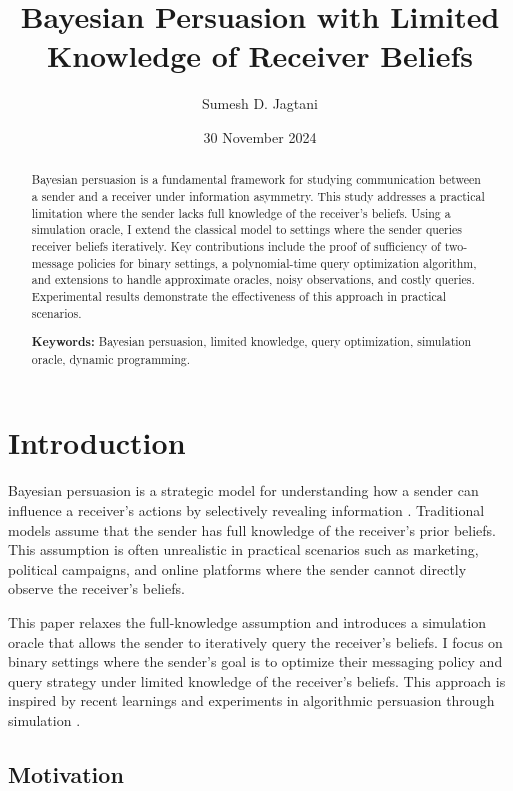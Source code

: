 \documentclass[12pt]{article}
\title{Bayesian Persuasion with Limited Knowledge of Receiver Beliefs}
\author{Sumesh D. Jagtani}
\date{30 November 2024}
\begin{document}
\maketitle

\begin{abstract}
Bayesian persuasion is a fundamental framework for studying communication between a sender and a receiver under information asymmetry. This study addresses a practical limitation where the sender lacks full knowledge of the receiver's beliefs. Using a simulation oracle, I extend the classical model to settings where the sender queries receiver beliefs iteratively. Key contributions include the proof of sufficiency of two-message policies for binary settings, a polynomial-time query optimization algorithm, and extensions to handle approximate oracles, noisy observations, and costly queries. Experimental results demonstrate the effectiveness of this approach in practical scenarios.

\textbf{Keywords:} Bayesian persuasion, limited knowledge, query optimization, simulation oracle, dynamic programming.
\end{abstract}

\section{Introduction}

Bayesian persuasion is a strategic model for understanding how a sender can influence a receiver's actions by selectively revealing information \cite{Kamenica2011}. Traditional models assume that the sender has full knowledge of the receiver's prior beliefs. This assumption is often unrealistic in practical scenarios such as marketing, political campaigns, and online platforms where the sender cannot directly observe the receiver's beliefs.

This paper relaxes the full-knowledge assumption and introduces a simulation oracle that allows the sender to iteratively query the receiver's beliefs. I focus on binary settings where the sender's goal is to optimize their messaging policy and query strategy under limited knowledge of the receiver's beliefs. This approach is inspired by recent learnings and experiments in algorithmic persuasion through simulation \cite{Harris2023}.

\subsection{Motivation}
\end{document}
